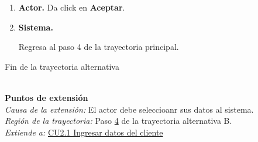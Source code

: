 \begin{itemize}
\begin{enumerate}
				\item \textbf{Actor.} Da click en \textbf{Aceptar}.
				
				\item \hypertarget{CU1:TAB:P4} {\textbf{Sistema.}} Regresa al paso 4 de la trayectoria principal.
	
			\end{enumerate}
			
			Fin de la trayectoria alternativa
		

	\end{itemize}

	\noindent \textbf{\\Puntos de extensión}\\

		\noindent \textit{Causa de la extensión:} El actor debe seleccioanr sus datos al sistema.\\
		\textit{Región de la trayectoria:} Paso \hyperlink{CU1:TAB:P4}{4} de la trayectoria alternativa B.\\
		\textit{Extiende a:} \hyperlink{CU2.1}{CU2.1 Ingresar datos del cliente}\\

		


